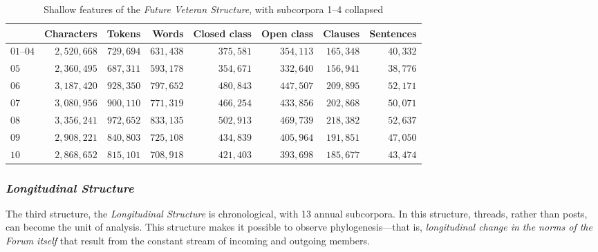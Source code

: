 \begin{table}[htb]
\centering
\small
\begin{tabular}{lrrrrrrr}
\toprule
{} &  Characters &  Tokens &   Words &  Closed class &  Open class &  Clauses &  Sentences \\
\midrule
$01\mbox{--}04$ &    $2,520,668$ &  $729,694$ &  $631,438$ &        $375,581$ &   $354,113$ &   $165,348$ &      $40,332$ \\
$05$    &            $2,360,495$ &  $687,311$ &  $593,178$ &        $354,671$ &   $332,640$ &   $156,941$ &      $38,776$ \\
$06$    &            $3,187,420$ &  $928,350$ &  $797,652$ &        $480,843$ &   $447,507$ &   $209,895$ &      $52,171$ \\
$07$    &            $3,080,956$ &  $900,110$ &  $771,319$ &        $466,254$ &   $433,856$ &   $202,868$ &      $50,071$ \\
$08$    &            $3,356,241$ &  $972,652$ &  $833,135$ &        $502,913$ &   $469,739$ &   $218,382$ &      $52,637$ \\
$09$    &            $2,908,221$ &  $840,803$ &  $725,108$ &        $434,839$ &   $405,964$ &   $191,851$ &      $47,050$ \\
$10$    &            $2,868,652$ &  $815,101$ &  $708,918$ &        $421,403$ &   $393,698$ &   $185,677$ &      $43,474$ \\
\bottomrule
\end{tabular}
\caption[Shallow features of the \emph{Future Veteran Structure}]{Shallow features of the \emph{Future Veteran Structure}, with subcorpora 1--4 collapsed}
\label{tab:shallow_V}
\end{table}

\subsubsection*{\emph{Longitudinal Structure}} \label{sect:l-corpus}

The third structure, the \emph{Longitudinal Structure} is chronological, with 13 annual subcorpora. In this structure, \glspl{thread}, rather than \glspl{post}, can become the unit of analysis. This structure makes it possible to observe phylogenesis---that is, \emph{longitudinal change in the norms of the \gls{Forum} itself} that result from the constant stream of incoming and outgoing members.

